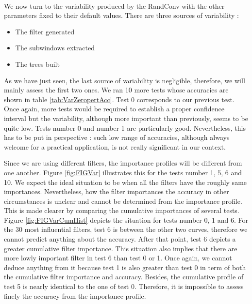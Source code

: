 \documentclass[a4paper]{report}
\begin{document}
		\paragraph{}
		We now turn to the variability produced by the RandConv with the other parameters fixed to their default values. There are three sources of variability :
		
		\begin{itemize}
			\item The filter generated
			\item The subwindows extracted
			\item The trees built
		\end{itemize}
		
		As we have just seen, the last source of variability is negligible, therefore, we will mainly assess the first two ones. We ran 10 more tests whose accuracies are shown in table \ref{tab:VarZeropertAcc}. Test 0 corresponds to our previous test. Once again, more tests would be required to establish a proper confidence interval but the variability, although more important than previously, seems to be quite low. Tests number 0 and number 1 are particularly good. Nevertheless, this has to be put in perspective : such low range of accuracies, although always welcome for a practical application, is not really significant in our context.
		\par
		Since we are using different filters, the importance profiles will be different from one another. Figure \ref{fig:FIGVar} illustrates this for the tests number 1, 5, 6 and 10. We expect the ideal situation to be when all the filters have the roughly same importances. Nevertheless, how the filter importances the accuracy in other circumstances is unclear and cannot be determined from the importance profile. This is made clearer by comparing the cumulative importances of several tests. Figure \ref{fig:FIGVarCumHist} depicts the situation for tests number 0, 1 and 6. For the 30 most influential filters, test 6 is between the other two curves, therefore we cannot predict anything about the accuracy. After that point, test 6 depicts a greater cumulative filter importance. This situation also implies that there are more lowly important filter in test 6 than test 0 or 1. Once again, we cannot deduce anything from it because test 1 is also greater than test 0 in term of both the cumulative filter importance and accuracy. Besides, the cumulative profile of test 5 is nearly identical to the one of test 0. Therefore, it is impossible to assess finely the accuracy from the importance profile.
		
\end{document}
